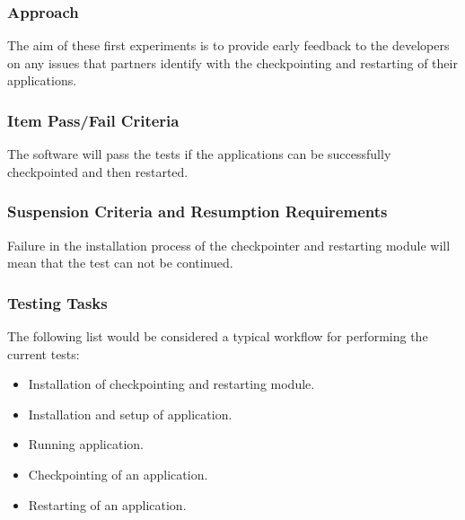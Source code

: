 \subsubsection{Approach}
The aim of these first experiments is to provide early feedback to the developers on any issues that partners identify with the checkpointing and restarting of their applications.

\subsubsection{Item Pass/Fail Criteria}
The software will pass the tests if the applications can be successfully checkpointed and then restarted. 

\subsubsection{Suspension Criteria and Resumption Requirements}
Failure in the installation process of the checkpointer and restarting module will mean that the test can not be continued.

\subsubsection{Testing Tasks}
The following list would be considered a typical workflow for performing the current tests:
\begin{itemize}
\item Installation of checkpointing and restarting module.
\item Installation and setup of application.
\item Running application.
\item Checkpointing of an application.
\item Restarting of an application.
\end{itemize}

